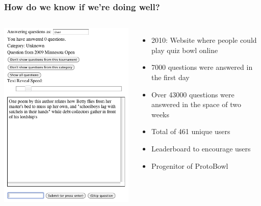 \documentclass[compress]{beamer}
\begin{document}
\begin{frame}
\frametitle{How do we know if we're doing well?}

\begin{columns}


	\begin{center}
		\includegraphics[width=0.8\linewidth]{qb/screenshot}
	\end{center}


	\begin{itemize}
		\item 2010: Website where people could play quiz bowl online
		\item 7000 questions were answered in the first day
		\item Over 43000 questions were answered in the space of two weeks
		\item Total of 461 unique users
		\item Leaderboard to encourage users
		\pause
		\item Progenitor of ProtoBowl
	\end{itemize}

\end{columns}
\end{frame}
\end{document}
